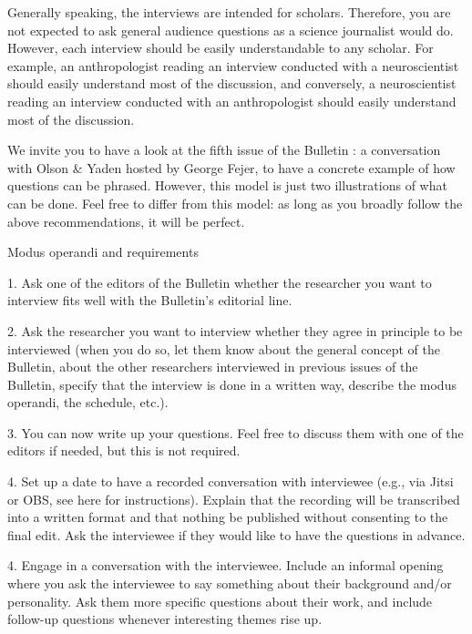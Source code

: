 \documentclass[11pt]{article}
\begin{document}
Generally speaking, the interviews are intended for scholars. Therefore, you are not expected to ask general audience questions as a science journalist would do. However, each interview should be easily understandable to any scholar. For example, an anthropologist reading an interview conducted with a neuroscientist should easily understand most of the discussion, and conversely, a neuroscientist reading an interview conducted with an anthropologist should easily understand most of the discussion.\par

We invite you to have a look at the fifth issue of the Bulletin : a conversation with Olson \& Yaden hosted by George Fejer, to have a concrete example of how questions can be phrased. However, this model is just two illustrations of what can be done. Feel free to differ from this model: as long as you broadly follow the above recommendations, it will be perfect.\par

Modus operandi and requirements\par

1. Ask one of the editors of the Bulletin whether the researcher you want to interview fits well with the Bulletin’s editorial line.\par

2. Ask the researcher you want to interview whether they agree in principle to be interviewed (when you do so, let them know about the general concept of the Bulletin, about the other researchers interviewed in previous issues of the Bulletin, specify that the interview is done in a written way, describe the modus operandi, the schedule, etc.).\par

3. You can now write up your questions. Feel free to discuss them with one of the editors if needed, but this is not required.\par

4. Set up a date to have a recorded conversation with interviewee (e.g., via Jitsi or OBS, see here for instructions). Explain that the recording will be transcribed into a written format and that nothing be published without consenting to the final edit. Ask the interviewee if they would like to have the questions in advance.\par

4. Engage in a conversation with the interviewee. Include an informal opening where you ask the interviewee to say something about their background and/or personality. Ask them more specific questions about their work, and include follow-up questions whenever interesting themes rise up.
\end{document}
